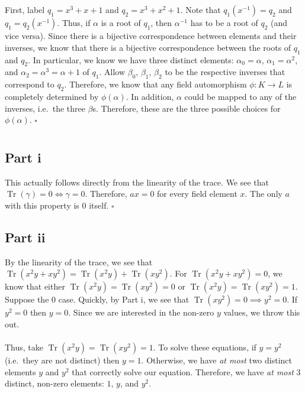 \documentclass[letterpaper]{article}
\newcommand*{\QED}{\hfill\ensuremath{\square}}%
\DeclareMathOperator{\tr}{Tr}
\begin{document}
\section{}
\label{sec:Question6}

First, label $ q_1 = x^3 + x + 1 $ and $ q_2 = x^3 + x^2 + 1 $.
Note that $ q_1(x^{-1}) = q_2 $ and $ q_1 = q_2(x^{-1}) $.
Thus, if $ \alpha $ is a root of $ q_1 $, then $ \alpha^{-1} $ has to be a root of $ q_2 $ (and vice versa).
Since there is a bijective correspondence between elements and their inverses, we know that there is a bijective correspondence between the roots of $ q_1 $ and $ q_2 $.
In particular, we know we have three distinct elements: $ \alpha_0 = \alpha $, $ \alpha_1 = \alpha^2 $, and $ \alpha_2 = \alpha^3 = \alpha + 1 $ of $ q_1 $.
Allow $ \beta_0 $, $ \beta_1 $, $ \beta_2 $ to be the respective inverses that correspond to $ q_2 $.
Therefore, we know that any field automorphism $ \phi : K \to L $ is completely determined by $ \phi(\alpha) $.
In addition, $ \alpha $ could be mapped to any of the inverses, i.e.\ the three $ \beta $s.
Therefore, these are the three possible choices for $ \phi(\alpha) $.
\QED{}

\section{}
\label{sec:Question7}

\subsection{Part i}
\label{sec:7Parti}

This actually follows directly from the linearity of the trace.
We see that $ \tr{(\gamma)} = 0 \iff \gamma = 0 $.
Therefore, $ ax = 0 $ for every field element $ x $.
The only $ a $ with this property is $ 0 $ itself.
\QED{}

\subsection{Part ii}
\label{sec:7Partii}

By the linearity of the trace, we see that $ \tr{(x^2y + xy^2)} = \tr{(x^2 y)} + \tr{(xy^2)} $.
For $ \tr{(x^2y + xy^2)} = 0 $, we know that either $ \tr{(x^2 y)} = \tr{(xy^2)} = 0 $ or $ \tr{(x^2 y)} = \tr{(xy^2)} = 1 $.
Suppose the $ 0 $ case.
Quickly, by Part i, we see that $ \tr{(xy^2)} = 0 \implies y^2 = 0 $.
If $ y^2 = 0 $ then $ y = 0 $.
Since we are interested in the non-zero $ y $ values, we throw this out.
\\ \\
Thus, take $ \tr{(x^2 y)} = \tr{(xy^2)} = 1 $.
To solve these equations, if $ y = y^2 $ (i.e.\ they are not distinct) then $ y = 1 $.
Otherwise, we have \textit{at most} two distinct elements $ y $ and $ y^2 $ that correctly solve our equation.
Therefore, we have \textit{at most} $ 3 $ distinct, non-zero elements: $ 1 $, $ y $, and $ y^2 $.
\end{document}
